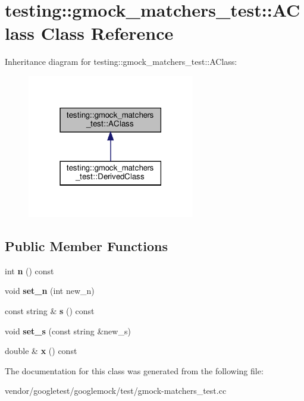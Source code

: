\hypertarget{classtesting_1_1gmock__matchers__test_1_1_a_class}{}\section{testing\+:\+:gmock\+\_\+matchers\+\_\+test\+:\+:A\+Class Class Reference}
\label{classtesting_1_1gmock__matchers__test_1_1_a_class}


Inheritance diagram for testing\+:\+:gmock\+\_\+matchers\+\_\+test\+:\+:A\+Class\+:
\nopagebreak
\begin{figure}[H]
\begin{center}
\leavevmode
\includegraphics[width=207pt]{classtesting_1_1gmock__matchers__test_1_1_a_class__inherit__graph}
\end{center}
\end{figure}
\subsection*{Public Member Functions}
\begin{DoxyCompactItemize}
\item 
\mbox{\label{classtesting_1_1gmock__matchers__test_1_1_a_class_add84ab9ef4a6bbe78719a9528bf6fb90}} 
int {\bfseries n} () const
\item 
\mbox{\label{classtesting_1_1gmock__matchers__test_1_1_a_class_a3181466cec6faa5ab3c6bc5c4dbf67b2}} 
void {\bfseries set\+\_\+n} (int new\+\_\+n)
\item 
\mbox{\label{classtesting_1_1gmock__matchers__test_1_1_a_class_a0ca922c6dbf894df355c1ce2082468ba}} 
const string \& {\bfseries s} () const
\item 
\mbox{\label{classtesting_1_1gmock__matchers__test_1_1_a_class_a131c5d2da4b5984f5af3fd84898eaf09}} 
void {\bfseries set\+\_\+s} (const string \&new\+\_\+s)
\item 
\mbox{\label{classtesting_1_1gmock__matchers__test_1_1_a_class_ade61d438cb535d71d0dcc17a1d5bd7cd}} 
double \& {\bfseries x} () const
\end{DoxyCompactItemize}


The documentation for this class was generated from the following file\+:\begin{DoxyCompactItemize}
\item 
vendor/googletest/googlemock/test/gmock-\/matchers\+\_\+test.\+cc\end{DoxyCompactItemize}
